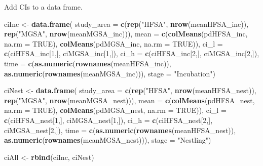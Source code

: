 \documentclass[]{article}
\newenvironment{Shaded}{\begin{snugshade}}{\end{snugshade}}
\newcommand{\DataTypeTok}[1]{\textcolor[rgb]{0.13,0.29,0.53}{#1}}
\newcommand{\DecValTok}[1]{\textcolor[rgb]{0.00,0.00,0.81}{#1}}
\newcommand{\KeywordTok}[1]{\textcolor[rgb]{0.13,0.29,0.53}{\textbf{#1}}}
\newcommand{\NormalTok}[1]{#1}
\newcommand{\OtherTok}[1]{\textcolor[rgb]{0.56,0.35,0.01}{#1}}
\newcommand{\StringTok}[1]{\textcolor[rgb]{0.31,0.60,0.02}{#1}}
\begin{document}
Add CIs to a data frame.

\begin{Shaded}
\begin{Highlighting}[]
\NormalTok{ciInc <-}\StringTok{ }\KeywordTok{data.frame}\NormalTok{(}
    \DataTypeTok{study_area =} \KeywordTok{c}\NormalTok{(}\KeywordTok{rep}\NormalTok{(}\StringTok{"HFSA"}\NormalTok{, }\KeywordTok{nrow}\NormalTok{(meanHFSA_inc)), }\KeywordTok{rep}\NormalTok{(}\StringTok{"MGSA"}\NormalTok{, }\KeywordTok{nrow}\NormalTok{(meanMGSA_inc))),}
    \DataTypeTok{mean =} \KeywordTok{c}\NormalTok{(}\KeywordTok{colMeans}\NormalTok{(pdHFSA_inc, }\DataTypeTok{na.rm =} \OtherTok{TRUE}\NormalTok{), }\KeywordTok{colMeans}\NormalTok{(pdMGSA_inc, }\DataTypeTok{na.rm =} \OtherTok{TRUE}\NormalTok{)),}
    \DataTypeTok{ci_l =} \KeywordTok{c}\NormalTok{(ciHFSA_inc[}\DecValTok{1}\NormalTok{,], ciMGSA_inc[}\DecValTok{1}\NormalTok{,]),}
    \DataTypeTok{ci_h =} \KeywordTok{c}\NormalTok{(ciHFSA_inc[}\DecValTok{2}\NormalTok{,], ciMGSA_inc[}\DecValTok{2}\NormalTok{,]),}
    \DataTypeTok{time =} \KeywordTok{c}\NormalTok{(}\KeywordTok{as.numeric}\NormalTok{(}\KeywordTok{rownames}\NormalTok{(meanHFSA_inc)), }\KeywordTok{as.numeric}\NormalTok{(}\KeywordTok{rownames}\NormalTok{(meanMGSA_inc))),}
    \DataTypeTok{stage =} \StringTok{"Incubation"}\NormalTok{)}


\NormalTok{ciNest <-}\StringTok{ }\KeywordTok{data.frame}\NormalTok{(}
    \DataTypeTok{study_area =} \KeywordTok{c}\NormalTok{(}\KeywordTok{rep}\NormalTok{(}\StringTok{"HFSA"}\NormalTok{, }\KeywordTok{nrow}\NormalTok{(meanHFSA_nest)), }\KeywordTok{rep}\NormalTok{(}\StringTok{"MGSA"}\NormalTok{, }\KeywordTok{nrow}\NormalTok{(meanMGSA_nest))),}
    \DataTypeTok{mean =} \KeywordTok{c}\NormalTok{(}\KeywordTok{colMeans}\NormalTok{(pdHFSA_nest, }\DataTypeTok{na.rm =} \OtherTok{TRUE}\NormalTok{), }\KeywordTok{colMeans}\NormalTok{(pdMGSA_nest, }\DataTypeTok{na.rm =} \OtherTok{TRUE}\NormalTok{)),}
    \DataTypeTok{ci_l =} \KeywordTok{c}\NormalTok{(ciHFSA_nest[}\DecValTok{1}\NormalTok{,], ciMGSA_nest[}\DecValTok{1}\NormalTok{,]),}
    \DataTypeTok{ci_h =} \KeywordTok{c}\NormalTok{(ciHFSA_nest[}\DecValTok{2}\NormalTok{,], ciMGSA_nest[}\DecValTok{2}\NormalTok{,]),}
    \DataTypeTok{time =} \KeywordTok{c}\NormalTok{(}\KeywordTok{as.numeric}\NormalTok{(}\KeywordTok{rownames}\NormalTok{(meanHFSA_nest)), }\KeywordTok{as.numeric}\NormalTok{(}\KeywordTok{rownames}\NormalTok{(meanMGSA_nest))),}
    \DataTypeTok{stage =} \StringTok{"Nestling"}\NormalTok{)}
    
\NormalTok{ciAll <-}\StringTok{ }\KeywordTok{rbind}\NormalTok{(ciInc, ciNest)}
\end{Highlighting}
\end{Shaded}
\end{document}
